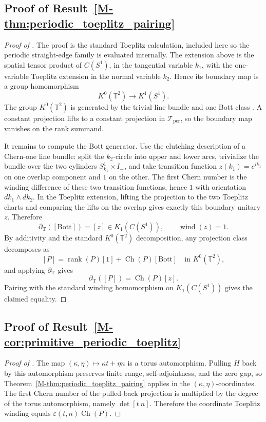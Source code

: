 \documentclass[11pt]{article}
\numberwithin{equation}{section}
\theoremstyle{definition}
\theoremstyle{remark}
\newcommand{\Ch}{\operatorname{Ch}}
\begin{document}
\subsection{Proof of Result~\ref{M-thm:periodic_toeplitz_pairing}}\label{app:proof:thm:periodic_toeplitz_pairing}
\begin{proof}[Proof of ]
The proof is the standard Toeplitz calculation, included here so the periodic straight-edge family
is evaluated internally. The extension above is the spatial tensor product of \(C(S^1)\), in the
tangential variable \(k_1\), with the one-variable Toeplitz extension in the normal variable
\(k_2\). Hence its boundary map is a group homomorphism
\[
K^0(\mathbb T^2)\longrightarrow K^1(S^1).
\]
The group \(K^0(\mathbb T^2)\) is generated by the trivial line bundle and one Bott class
\cite{AtiyahKTheory,BlackadarKTheory}. A
constant projection lifts to a constant projection in \(\mathcal T_{\mathrm{per}}\), so the
boundary map vanishes on the rank summand.

It remains to compute the Bott generator. Use the clutching description of a Chern-one line
bundle: split the \(k_2\)-circle into upper and lower arcs, trivialize the bundle over the two
cylinders \(S^1_{k_1}\times I_\pm\), and take transition function \(z(k_1)=e^{ik_1}\) on one
overlap component and \(1\) on the other. The first Chern number is the winding difference of
these two transition functions, hence \(1\) with orientation \(dk_1\wedge dk_2\). In the Toeplitz
extension, lifting the projection to the two Toeplitz charts and comparing the lifts on the
overlap gives exactly this boundary unitary \(z\). Therefore
\[
\partial_{\mathrm T}([\mathrm{Bott}])=[z]\in K_1(C(S^1)),
\qquad
\operatorname{wind}(z)=1.
\]
By additivity and the standard \(K^0(\mathbb T^2)\) decomposition, any projection class decomposes as
\[
[P]=\operatorname{rank}(P)[1]+\Ch(P)[\mathrm{Bott}]
\quad\text{in }K^0(\mathbb T^2),
\]
and applying \(\partial_{\mathrm T}\) gives
\[
\partial_{\mathrm T}([P])=\Ch(P)[z].
\]
Pairing with the standard winding homomorphism on \(K_1(C(S^1))\) gives the claimed equality.
\end{proof}

\subsection{Proof of Result~\ref{M-cor:primitive_periodic_toeplitz}}\label{app:proof:cor:primitive_periodic_toeplitz}
\begin{proof}[Proof of ]
The map \((\kappa,\eta)\mapsto \kappa t+\eta n\) is a torus automorphism. Pulling \(H\) back by
this automorphism preserves finite range, self-adjointness, and the zero gap, so
Theorem~\ref{M-thm:periodic_toeplitz_pairing} applies in the \((\kappa,\eta)\)-coordinates. The
first Chern number of the pulled-back projection is multiplied by the degree of the torus
automorphism, namely \(\det[t\ n]\). Therefore the coordinate Toeplitz winding equals
\(\varepsilon(t,n)\Ch(P)\).
\end{proof}
\end{document}
